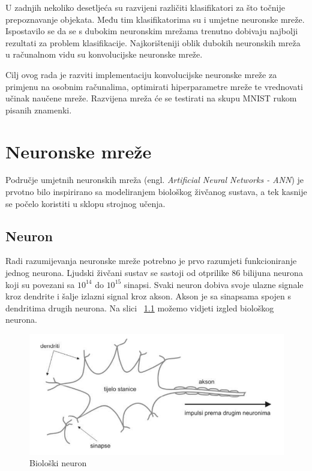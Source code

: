 \documentclass[times, utf8, zavrsni, numeric]{fer}
\begin{document}
U zadnjih nekoliko desetljeća su razvijeni različiti klasifikatori za što točnije prepoznavanje objekata. Među tim klasifikatorima su i umjetne neuronske mreže. Ispostavilo se da se s dubokim neuronskim mrežama trenutno dobivaju najbolji rezultati za problem klasifikacije. Najkorišteniji oblik dubokih neuronskih mreža u računalnom vidu su konvolucijske neuronske mreže.

Cilj ovog rada je razviti implementaciju konvolucijske neuronske mreže za primjenu na osobnim računalima, optimirati hiperparametre mreže te vrednovati učinak naučene mreže. Razvijena mreža će se testirati na skupu MNIST rukom pisanih znamenki.
\chapter{Neuronske mreže}
Područje umjetnih neuronskih mreža (engl. \textit{Artificial Neural Networks - ANN}) je prvotno bilo inspirirano sa modeliranjem biološkog živčanog sustava, a tek kasnije se počelo koristiti u sklopu strojnog učenja. 
\section{Neuron}
Radi razumijevanja neuronske mreže potrebno je prvo razumjeti funkcioniranje jednog neurona. Ljudski živčani sustav se sastoji od otprilike 86 bilijuna neurona koji su povezani sa $10^{14}$ do $10^{15}$ sinapsi. Svaki neuron dobiva svoje ulazne signale kroz dendrite i šalje izlazni signal kroz akson. Akson je sa sinapsama spojen s dendritima drugih neurona. Na slici ~\ref{fig:bio-neuron} možemo vidjeti izgled biološkog neurona.
\begin{figure}
    \centering
    \includegraphics[width=12cm]{img/bio-neuron.png}
    \caption{Biološki neuron}
    \label{fig:bio-neuron}
\end{figure}
\end{document}
